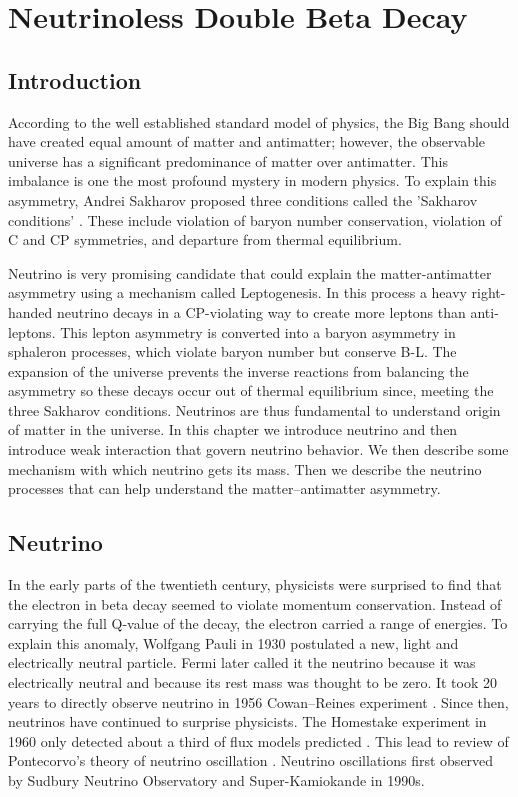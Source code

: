 \chapter{Neutrinoless Double Beta Decay}

\section{Introduction}
According to the well established standard model of physics, the Big Bang should have created equal amount of matter and antimatter; however, the observable universe has a significant predominance of matter over antimatter. This imbalance is one the most profound mystery in modern physics. To explain this asymmetry, Andrei Sakharov proposed three conditions called the 'Sakharov conditions' \cite{sakharov_1991}. These include violation of baryon number conservation, violation of C and CP symmetries, and departure from thermal equilibrium.

Neutrino is very promising candidate that could explain the matter-antimatter asymmetry using a mechanism called Leptogenesis. In this process a heavy right-handed neutrino decays in a CP-violating way to create more leptons than anti-leptons. This lepton asymmetry is converted into a baryon asymmetry in sphaleron processes, which violate baryon number but conserve B-L. The expansion of the universe prevents the inverse reactions from balancing the asymmetry so these decays occur out of thermal equilibrium since, meeting the three Sakharov conditions. Neutrinos are thus fundamental to understand origin of matter in the universe. In this chapter we introduce neutrino and then introduce weak interaction that govern neutrino behavior. We then describe some mechanism with which neutrino gets its mass. Then we describe the neutrino processes that can help understand the matter–antimatter asymmetry.

\section{Neutrino}
In the early parts of the twentieth century, physicists were surprised to find that the electron in beta decay seemed to violate momentum conservation. Instead of carrying the full Q-value of the decay, the electron carried a range of energies. To explain this anomaly, Wolfgang Pauli in 1930 postulated a new, light and electrically neutral particle. Fermi later called it the neutrino because it was electrically neutral and because its rest mass was thought to be zero. It took 20 years to directly observe neutrino in 1956 Cowan–Reines experiment \cite{PhysRev.92.830}. Since then, neutrinos have continued to surprise physicists. The Homestake experiment in 1960 only detected about a third of flux models predicted \cite{Cleveland:1998nv}. This lead to review of Pontecorvo’s theory of neutrino oscillation \cite{Pontecorvo:1967fh}. Neutrino oscillations first observed by Sudbury Neutrino Observatory \cite{SNO:2001kpb} and Super-Kamiokande \cite{Super_Kamiokande_1998kpq} in 1990s. 

